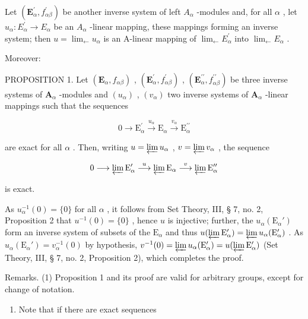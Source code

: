 Let \((\mathbf{E}_{\alpha}^{\prime}, f_{\alpha\beta}^{\prime})\) be another inverse system of left \(A_{\alpha}\) -modules and, for all \(\alpha\) , let \(u_{\alpha}: E_{\alpha}^{\prime} \to E_{\alpha}\) be an \(A_{\alpha}\) -linear mapping, these mappings forming an inverse system; then \(u = \lim_{\leftarrow} u_{\alpha}\) is an A-linear mapping of \(\lim_{\leftarrow} E_{\alpha}^{\prime}\) into \(\lim_{\leftarrow} E_{\alpha}\) .

Moreover:

PROPOSITION 1. Let \((\mathbf{E}_{\alpha}, f_{\alpha\beta})\) , \((\mathbf{E}_{\alpha}^{\prime}, f_{\alpha\beta}^{\prime})\) , \((\mathbf{E}_{\alpha}^{\prime \prime}, f_{\alpha\beta}^{\prime \prime})\) be three inverse systems of \(\mathbf{A}_{\alpha}\) -modules and \((u_{\alpha})\) , \((v_{\alpha})\) two inverse systems of \(\mathbf{A}_{\alpha}\) -linear mappings such that the sequences

\[
0 \longrightarrow \mathrm{E} _ {\alpha} ^ {\prime} \stackrel {u _ {\alpha}} {\longrightarrow} \mathrm{E} _ {\alpha} \stackrel {v _ {\alpha}} {\longrightarrow} \mathrm{E} _ {\alpha} ^ {\prime \prime}
\]

are exact for all \(\alpha\) . Then, writing \(u = \varprojlim u_{\alpha}\) , \(v = \varprojlim v_{\alpha}\) , the sequence

\[
0 \longrightarrow \varprojlim \mathrm{E} _ {\alpha} ^ {\prime} \stackrel {u} {\longrightarrow} \varprojlim \mathrm{E} _ {\alpha} \stackrel {v} {\longrightarrow} \varprojlim \mathrm{E} _ {\alpha} ^ {\prime \prime}
\]

is exact.

As \(u_{\alpha}^{-1}(0) = \{0\}\) for all \(\alpha\) , it follows from Set Theory, III, § 7, no. 2, Proposition 2 that \(u^{-1}(0) = \{0\}\) , hence \(u\) is injective; further, the \(u_{\alpha}(\mathrm{E}_{\alpha}')\) form an inverse system of subsets of the \(\mathrm{E}_{\alpha}\) and thus \(u(\varprojlim \mathrm{E}_{\alpha}') = \varprojlim u_{\alpha}(\mathrm{E}_{\alpha}')\) . As \(u_{\alpha}(\mathrm{E}_{\alpha}') = v_{\alpha}^{-1}(0)\) by hypothesis, \(v^{-1}(0) = \varprojlim u_{\alpha}(\mathrm{E}_{\alpha}') = u(\varprojlim \mathrm{E}_{\alpha}')\) (Set Theory, III, § 7, no. 2, Proposition 2), which completes the proof.

Remarks. (1) Proposition 1 and its proof are valid for arbitrary groups, except for change of notation.

\begin{enumerate}
\def\labelenumi{(\arabic{enumi})}
\setcounter{enumi}{1}
\tightlist
\item
  Note that if there are exact sequences
\end{enumerate}

